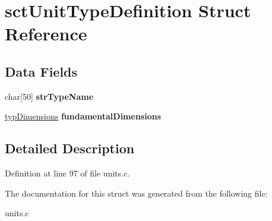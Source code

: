 \hypertarget{structsctUnitTypeDefinition}{\section{sct\-Unit\-Type\-Definition Struct Reference}
\label{structsctUnitTypeDefinition}
}
\subsection*{Data Fields}
\begin{DoxyCompactItemize}
\item 
\hypertarget{structsctUnitTypeDefinition_aa18cd3979626a49e95dc252a5a4b2dc9}{char\mbox{[}50\mbox{]} {\bfseries str\-Type\-Name}}\label{structsctUnitTypeDefinition_aa18cd3979626a49e95dc252a5a4b2dc9}

\item 
\hypertarget{structsctUnitTypeDefinition_a2ecbb9371aad40600c0a53be39763163}{\hyperlink{structsctDimensions}{typ\-Dimensions} {\bfseries fundamental\-Dimensions}}\label{structsctUnitTypeDefinition_a2ecbb9371aad40600c0a53be39763163}

\end{DoxyCompactItemize}


\subsection{Detailed Description}


Definition at line 97 of file units.\-c.



The documentation for this struct was generated from the following file\-:\begin{DoxyCompactItemize}
\item 
units.\-c\end{DoxyCompactItemize}
